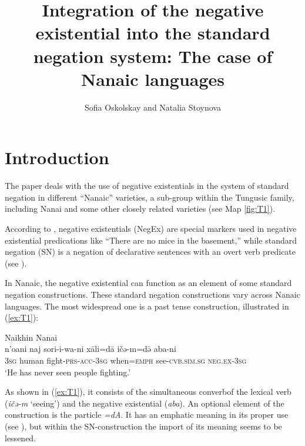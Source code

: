 \documentclass[output=paper]{langscibook}
\author{Sofia Oskolskay \affiliation{Institute for Linguistic Studies, RAS} and Natalia Stoynova \affiliation{Russian Language Institute, RAS ; NRU Higher School of Economics}}
\title{Integration of the negative existential into the standard negation system: The case of Nanaic languages}
\begin{document}
\maketitle

\section{Introduction}\label{sec:T1}

The paper deals with the use of negative existentials in the system of standard negation in different “Nanaic” varieties, a sub-group within the Tungusic family, including Nanai and some other closely related varieties (see Map \ref{fig:T1}).

According to \citet[107]{Veselinova2013}, negative existentials (NegEx) are special markers used in negative existential predications like “There are no mice in the basement,” while standard negation (SN) is a negation of declarative sentences with an overt verb predicate (see \citealp[39–45]{Miestamo2005}).

In Nanaic, the negative existential can function as an element of some standard negation constructions. These standard negation constructions vary across Nanaic languages. The most widespread one is a past tense construction, illustrated in (\ref{ex:T1}):

\ea Naikhin Nanai \label{ex:T1}\\
	\gll n’oani	naj	sori-i-wa-ni	xāli=dā	ičə-m=də̄	aba-ni\\
	\textsc{3sg}	human	fight-\textsc{prs-acc-3sg}	when=\textsc{emph}	see-\textsc{cvb.sim.sg}	\textsc{neg.ex-3sg}\\
	\glt `He has never seen people fighting.' \citep[154, text]{avrorin1986a}
\z

As shown in (\ref{ex:T1}), it consists of the simultaneous converb\footnotemark of the lexical verb (\textit{ičə-m} ‘seeing’) and the negative existential (\textit{aba}). An optional element of the construction is the particle \textit{=dA}. It has an emphatic meaning in its proper use (see \citealp[264]{avrorin1961a}), but within the SN-construction the import of its meaning seems to be lessened.
\end{document}

